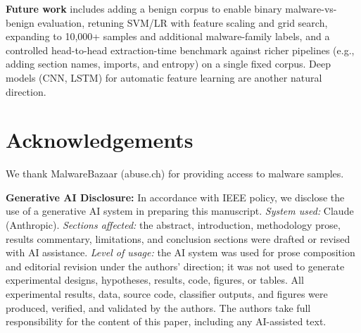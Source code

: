 \documentclass[conference,a4paper]{IEEEtran}
\begin{document}
\textbf{Future work} includes adding a benign corpus to enable binary malware-vs-benign evaluation, retuning SVM/LR with feature scaling and grid search, expanding to 10{,}000+ samples and additional malware-family labels, and a controlled head-to-head extraction-time benchmark against richer pipelines (e.g., adding section names, imports, and entropy) on a single fixed corpus. Deep models (CNN, LSTM) for automatic feature learning \cite{kumar2021mcft} are another natural direction.

\section*{Acknowledgements}
We thank MalwareBazaar (abuse.ch) for providing access to malware samples.

\textbf{Generative AI Disclosure:} In accordance with IEEE policy, we disclose the use of a generative AI system in preparing this manuscript. \textit{System used:} Claude~\cite{anthropic2026claude} (Anthropic). \textit{Sections affected:} the abstract, introduction, methodology prose, results commentary, limitations, and conclusion sections were drafted or revised with AI assistance. \textit{Level of usage:} the AI system was used for prose composition and editorial revision under the authors' direction; it was not used to generate experimental designs, hypotheses, results, code, figures, or tables. All experimental results, data, source code, classifier outputs, and figures were produced, verified, and validated by the authors. The authors take full responsibility for the content of this paper, including any AI-assisted text.

\end{document}
